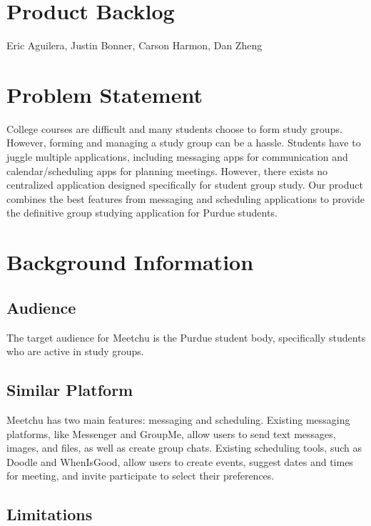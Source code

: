 \documentclass[12pt]{article}
\newcommand{\hwTitle}{Product Backlog}
\newcommand{\authorName}{Eric Aguilera, Justin Bonner, Carson Harmon, Dan Zheng}
\begin{document}
\section*{\Large \centering \hwTitle}
{\centering \authorName \par}

\section{Problem Statement}

College courses are difficult and many students choose to form study groups. However, forming and managing a study group can be a hassle. Students have to juggle multiple applications, including messaging apps for communication and calendar/scheduling apps for planning meetings. However, there exists no centralized application designed specifically for student group study. Our product combines the best features from messaging and scheduling applications to provide the definitive group studying application for Purdue students.

\section{Background Information}

\subsection*{Audience}

The target audience for Meetchu is the Purdue student body, specifically students who are active in study groups.

\subsection*{Similar Platform}

Meetchu has two main features: messaging and scheduling. Existing messaging platforms, like Messenger and GroupMe, allow users to send text messages, images, and files, as well as create group chats. Existing scheduling tools, such as Doodle and WhenIsGood, allow users to create events, suggest dates and times for meeting, and invite participate to select their preferences.

\subsection*{Limitations}
\end{document}
